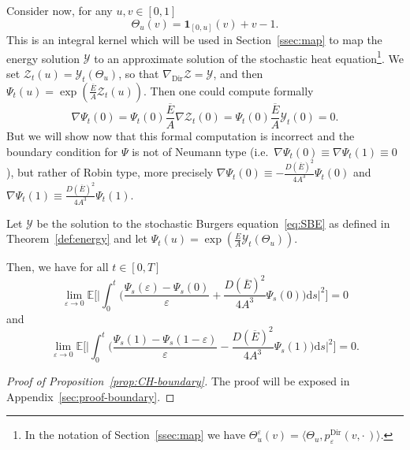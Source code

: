 \documentclass[10pt]{amsart}
\theoremstyle{definition}\newtheorem{defi}[theo]{Definition}\newtheorem{rema}[theo]{Remark}\newtheorem{exam}[theo]{Example}\newtheorem{exem}[theo]{Example}\newtheorem{nota}[theo]{Notation}
\DeclareMathOperator{\Dir}{Dir}
\newcommand{\mc}[1]{{\mathcal #1}}
\renewcommand{\mc}[1]{{\mathcal #1}}
\renewcommand{\bar}{\overline}
\newcommand*{\dd}{\mathrm{d}}
\newcommand*{\ds}{\dd s}
\renewcommand{\tfrac}{\frac}
\begin{document}
Consider now, for any $u,v\in[0,1]$
\[
\Theta_u(v) =\mathbf{1}_{[0, u]} (v) + v-1.
\]
This is an integral kernel which will be used in Section~\ref{ssec:map} to map the energy solution $\mc Y$ to an approximate solution of the stochastic heat equation\footnote{In the notation of Section~\ref{ssec:map} we have $\Theta^\varepsilon_u(v) = \langle \Theta_u, p_\varepsilon^{\Dir}(v,\cdot\,)\rangle$.}\!. We set $\mc Z_t(u) = \mc Y_t(\Theta_u)$, so that $\nabla_{\Dir} \mc Z = \mc Y$, and then $\Psi_t(u) = \exp(\tfrac{\bar{E}}{A} \mc Z_t(u))$. Then one could compute formally
\[
\nabla \Psi_t(0) = \Psi_t(0) \tfrac{\bar{E}}{A} \nabla \mc Z_t(0) = \Psi_t(0) \tfrac{\bar{E}}{A} \mc Y_t(0) = 0.
\]
But we will show now that this formal computation is incorrect and the boundary condition for $\Psi$ is not of Neumann type (i.e.~$\nabla \Psi_t(0) \equiv \nabla \Psi_t(1) \equiv 0$), but rather of Robin type, more precisely $\nabla \Psi_t(0) \equiv - \tfrac{D(\bar{E})^2}{4A^3} \Psi_t(0)$ and $\nabla \Psi_t(1) \equiv \tfrac{D(\bar{E})^2}{4A^3} \Psi_t(1)$.

\begin{prop}\label{prop:CH-boundary}
Let $\mc Y$ be the solution to the stochastic Burgers equation~\eqref{eq:SBE} as defined in Theorem~\ref{def:energy} and let $\Psi_t(u)=\exp(\frac E A \mc Y_t(\Theta_u))$.

Then, we have for all $t \in [0,T]$
\[
\lim_{\varepsilon \rightarrow 0} \mathbb{E} \bigg[
\bigg| \int_0^t \bigg(\frac{\Psi_s (\varepsilon) - \Psi_s(0)}{\varepsilon} + \frac{D(\bar{E})^2}{4A^3} \Psi_s(0) \bigg)\ds \bigg|^2 \bigg] = 0
\]
and
\[
\lim_{\varepsilon \rightarrow 0} \mathbb{E} \bigg[
\bigg| \int_0^t \bigg(\frac{\Psi_s (1) - \Psi_s(1-\varepsilon)}{\varepsilon} - \frac{D(\bar{E})^2}{4A^3} \Psi_s(1) \bigg)\ds \bigg|^2 \bigg] = 0.
\]
\end{prop}

\begin{proof}[Proof of Proposition~\ref{prop:CH-boundary}]
The proof will be exposed in Appendix~\ref{sec:proof-boundary}.
\end{proof}
\end{document}

